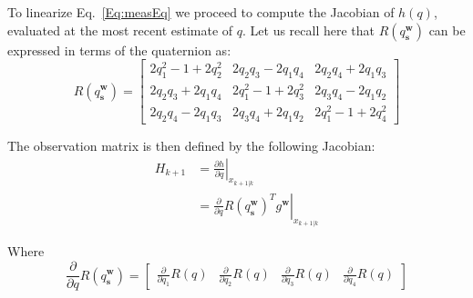 \documentclass[a4paper,10pt]{article}
\DeclareMathOperator{\sensor}{\mathbf{s}}
\DeclareMathOperator{\world}{\mathbf{w}}
\begin{document}
  To linearize Eq.~\ref{Eq:measEq} we proceed to compute the Jacobian of $h(q)$, evaluated at the most recent estimate of $q$. Let us recall here that $R(q^{\world}_{\sensor})$ can be expressed in terms of the quaternion as:
  \begin{equation}
   R(q^{\world}_{\sensor}) = \left[\begin{array}{ccc}
               2q^2_1-1+2q^2_2 & 2q_2q_3 - 2q_1q_4 & 2q_2q_4 + 2q_1q_3 \\
               2q_2q_3+2q_1q_4 & 2q^2_1-1+2q^2_3 & 2q_3q_4-2q_1q_2 \\
               2q_2q_4-2q_1q_3 & 2q_3q_4+2q_1q_2 & 2q^2_1-1+2q^2_4
              \end{array}\right]
  \end{equation}

  The observation matrix is then defined by the following Jacobian:
  \begin{align}
   H_{k+1} &= \left.\frac{\partial h}{\partial q} \right|_{x_{k+1|k}} \\
           &= \left.\frac{\partial}{\partial q} R(q^{\world}_{\sensor})^T g^{\world}\right|_{x_{k+1|k}}
  \end{align}

  Where
  \begin{equation}
  \frac{\partial}{\partial q} R(q^{\world}_{\sensor}) =\left[\begin{array}{cccc}
                                                \frac{\partial}{\partial q_1} R(q) & \frac{\partial}{\partial q_2} R(q) & \frac{\partial}{\partial q_3} R(q) & \frac{\partial}{\partial q_4} R(q)
                                               \end{array}\right]
  \end{equation}
\end{document}
